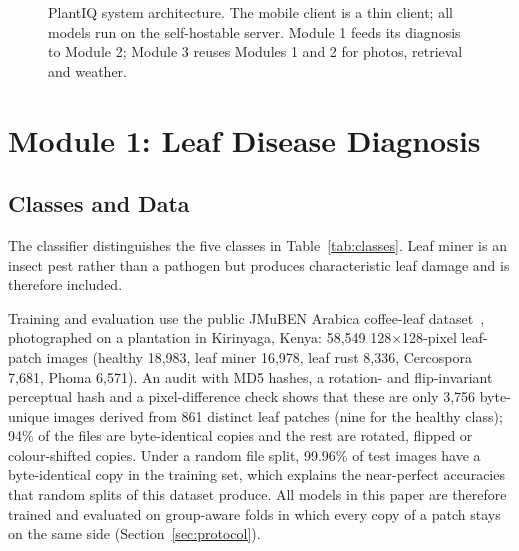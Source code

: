 \begin{figure}[t]
{}
\caption{PlantIQ system architecture. The mobile client is a thin client; all models run on the self-hostable server.
Module 1 feeds its diagnosis to Module 2; Module 3 reuses Modules 1 and 2 for photos, retrieval and weather.}
\label{fig:arch}
\end{figure}

\section{Module 1: Leaf Disease Diagnosis}
\subsection{Classes and Data}
The classifier distinguishes the five classes in Table~\ref{tab:classes}. Leaf miner is an insect pest rather than a
pathogen but produces characteristic leaf damage and is therefore included.

Training and evaluation use the public JMuBEN Arabica coffee-leaf dataset~\cite{jepkoech2021jmuben}, photographed on
a plantation in Kirinyaga, Kenya: 58,549 128$\times$128-pixel leaf-patch images (healthy 18,983, leaf miner 16,978, leaf rust 8,336, Cercospora 7,681, Phoma
6,571). An audit with MD5 hashes, a rotation- and flip-invariant perceptual hash and a pixel-difference check shows that
these are only 3,756 byte-unique images derived from 861 distinct leaf patches (nine for the healthy class); 94\% of the
files are byte-identical copies and the rest are rotated, flipped or colour-shifted copies. Under a random file split,
99.96\% of test images have a byte-identical copy in the training set, which explains the near-perfect accuracies that
random splits of this dataset produce. All models in this paper are therefore trained and evaluated on group-aware folds
in which every copy of a patch stays on the same side (Section~\ref{sec:protocol}).

